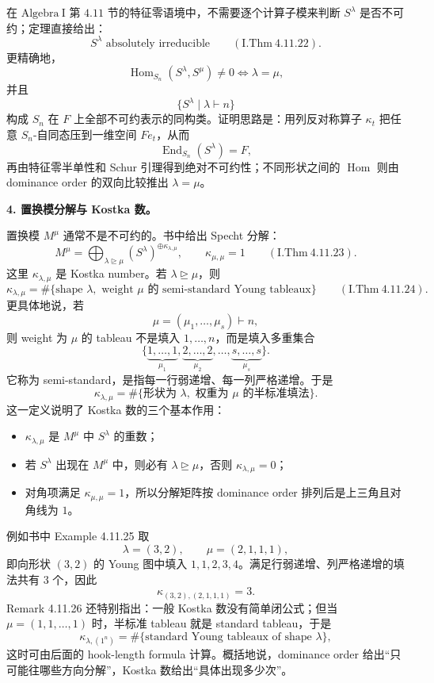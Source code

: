 \documentclass[a4paper]{ctexart}
\theoremstyle{definition}
\theoremstyle{analysis}
\theoremstyle{plain}
\begin{document}
在 \(\mathrm{Algebra\ I}\) 第 \(4.11\) 节的特征零语境中，不需要逐个计算子模来判断 \(S^\lambda\) 是否不可约；定理直接给出：
\[
  S^\lambda \text{ absolutely irreducible}
  \qquad
  (\mathrm{I.Thm}\ 4.11.22).
\]
更精确地，
\[
  \operatorname{Hom}_{S_n}(S^\lambda,S^\mu)\neq 0
  \iff
  \lambda=\mu,
\]
并且
\[
  \{S^\lambda\mid \lambda\vdash n\}
\]
构成 \(S_n\) 在 \(F\) 上全部不可约表示的同构类。证明思路是：用列反对称算子 \(\kappa_t\) 把任意 \(S_n\)-自同态压到一维空间 \(F e_t\)，从而
\[
  \operatorname{End}_{S_n}(S^\lambda)=F,
\]
再由特征零半单性和 Schur 引理得到绝对不可约性；不同形状之间的 \(\operatorname{Hom}\) 则由 dominance order 的双向比较推出 \(\lambda=\mu\)。

\medskip
{}\label{rem:kostka-number-detail}
\textbf{4. 置换模分解与 Kostka 数。}

置换模 \(M^\mu\) 通常不是不可约的。书中给出 Specht 分解：
\[
  M^\mu
  =
  \bigoplus_{\lambda\trianglerighteq\mu}
  (S^\lambda)^{\oplus \kappa_{\lambda,\mu}},
  \qquad
  \kappa_{\mu,\mu}=1
  \qquad
  (\mathrm{I.Thm}\ 4.11.23).
\]
这里 \(\kappa_{\lambda,\mu}\) 是 Kostka number。若 \(\lambda\trianglerighteq\mu\)，则
\[
  \kappa_{\lambda,\mu}
  =
  \#\{\text{shape }\lambda,\text{ weight }\mu\text{ 的 semi-standard Young tableaux}\}
  \qquad
  (\mathrm{I.Thm}\ 4.11.24).
\]
更具体地说，若
\[
  \mu=(\mu_1,\ldots,\mu_s)\vdash n,
\]
则 weight 为 \(\mu\) 的 tableau 不是填入 \(1,\ldots,n\)，而是填入多重集合
\[
  \{\underbrace{1,\ldots,1}_{\mu_1},
    \underbrace{2,\ldots,2}_{\mu_2},
    \ldots,
    \underbrace{s,\ldots,s}_{\mu_s}\}.
\]
它称为 semi-standard，是指每一行弱递增、每一列严格递增。于是
\[
  \kappa_{\lambda,\mu}
  =
  \#\{\text{形状为 }\lambda,\text{ 权重为 }\mu\text{ 的半标准填法}\}.
\]
这一定义说明了 Kostka 数的三个基本作用：
\begin{itemize}
  \item \(\kappa_{\lambda,\mu}\) 是 \(M^\mu\) 中 \(S^\lambda\) 的重数；
  \item 若 \(S^\lambda\) 出现在 \(M^\mu\) 中，则必有 \(\lambda\trianglerighteq\mu\)，否则 \(\kappa_{\lambda,\mu}=0\)；
  \item 对角项满足 \(\kappa_{\mu,\mu}=1\)，所以分解矩阵按 dominance order 排列后是上三角且对角线为 \(1\)。
\end{itemize}
例如书中 Example 4.11.25 取
\[
  \lambda=(3,2),
  \qquad
  \mu=(2,1,1,1),
\]
即向形状 \((3,2)\) 的 Young 图中填入 \(1,1,2,3,4\)。满足行弱递增、列严格递增的填法共有 \(3\) 个，因此
\[
  \kappa_{(3,2),(2,1,1,1)}=3.
\]
Remark 4.11.26 还特别指出：一般 Kostka 数没有简单闭公式；但当
\(\mu=(1,1,\ldots,1)\) 时，半标准 tableau 就是 standard tableau，于是
\[
  \kappa_{\lambda,(1^n)}
  =
  \#\{\text{standard Young tableaux of shape }\lambda\},
\]
这时可由后面的 hook-length formula 计算。概括地说，dominance order 给出“只可能往哪些方向分解”，Kostka 数给出“具体出现多少次”。
\end{document}
